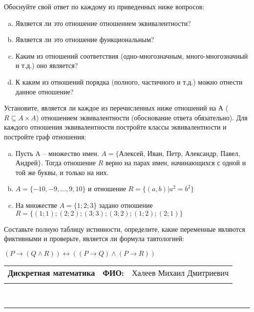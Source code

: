 \documentclass[10pt]{exam}
\newcommand{\class}{Дискретная математика}
\newcommand{\examdate}{}
\begin{document}
\begin{questions}
Обоснуйте свой ответ по каждому из приведенных ниже вопросов:
\begin{enumerate} [a)]\setcounter{enumi}{0}
    \item Является ли это отношение отношением эквивалентности?
    \item Является ли это отношение функциональным?
    \item Каким из отношений соответствия (одно-многозначным, много-многозначный и т.д.) оно является?
    \item К каким из отношений порядка (полного, частичного и т.д.) можно отнести данное отношение?
\end{enumerate}
\question
Установите, является ли каждое из перечисленных ниже отношений на А ($R \subseteq A \times A$) отношением эквивалентности (обоснование ответа обязательно). Для каждого отношения эквивалентности постройте классы 
эквивалентности и постройте граф отношения:
\begin{enumerate} [a)]\setcounter{enumi}{0}
\item Пусть A – множество имен. $A = \{ $Алексей, Иван, Петр, Александр, Павел, Андрей$ \}$. Тогда отношение $R$ верно на парах имен, начинающихся с одной и той же буквы, и только на них.
\item $A = \{-10, -9, … , 9, 10\}$ и отношение $ R = \{(a,b)|a^{2} = b^{2}\}$
\item На множестве $A = \{1; 2; 3\}$ задано отношение $R = \{(1; 1); (2; 2); (3; 3); (3; 2); (1; 2); (2; 1)\}$
\end{enumerate}\question Составьте полную таблицу истинности, определите, какие переменные являются фиктивными и проверьте, является ли формула тавтологией:

$(P \rightarrow (Q \land R)) \leftrightarrow ((P \rightarrow Q) \land (P \rightarrow R))$

\end{questions}
\newpage
\begin{flushright}
\begin{tabular}{p{2.8in} r l}
\textbf{\class} & \textbf{ФИО:} &Халеев Михаил Дмитриевич
\\

\textbf{\examdate} &&\\
\end{tabular}\\
\end{flushright}
\rule[1ex]{\textwidth}{.1pt}
\end{document}
